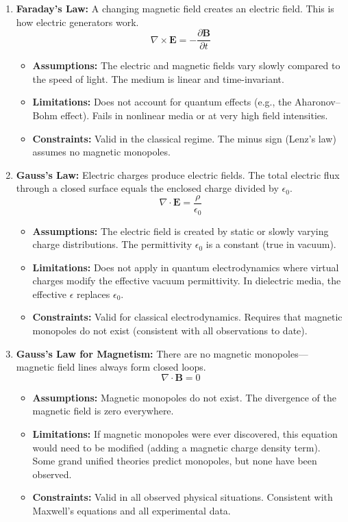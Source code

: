 \begin{enumerate}
\item \textbf{Faraday's Law:} A changing magnetic field creates an electric field. This is how electric generators work.
\[
\nabla\times\mathbf E=-\frac{\partial\mathbf B}{\partial t}
\]
\begin{itemize}
\item \textbf{Assumptions:} The electric and magnetic fields vary slowly compared to the speed of light. The medium is linear and time-invariant.
\item \textbf{Limitations:} Does not account for quantum effects (e.g., the Aharonov--Bohm effect). Fails in nonlinear media or at very high field intensities.
\item \textbf{Constraints:} Valid in the classical regime. The minus sign (Lenz's law) assumes no magnetic monopoles.
\end{itemize}

\item \textbf{Gauss's Law:} Electric charges produce electric fields. The total electric flux through a closed surface equals the enclosed charge divided by $\epsilon_0$.
\[
\nabla\cdot\mathbf E=\frac{\rho}{\epsilon_0}
\]
\begin{itemize}
\item \textbf{Assumptions:} The electric field is created by static or slowly varying charge distributions. The permittivity $\epsilon_0$ is a constant (true in vacuum).
\item \textbf{Limitations:} Does not apply in quantum electrodynamics where virtual charges modify the effective vacuum permittivity. In dielectric media, the effective $\epsilon$ replaces $\epsilon_0$.
\item \textbf{Constraints:} Valid for classical electrodynamics. Requires that magnetic monopoles do not exist (consistent with all observations to date).
\end{itemize}

\item \textbf{Gauss's Law for Magnetism:} There are no magnetic monopoles---magnetic field lines always form closed loops.
\[
\nabla\cdot\mathbf B=0
\]
\begin{itemize}
\item \textbf{Assumptions:} Magnetic monopoles do not exist. The divergence of the magnetic field is zero everywhere.
\item \textbf{Limitations:} If magnetic monopoles were ever discovered, this equation would need to be modified (adding a magnetic charge density term). Some grand unified theories predict monopoles, but none have been observed.
\item \textbf{Constraints:} Valid in all observed physical situations. Consistent with Maxwell's equations and all experimental data.
\end{itemize}


\end{enumerate}
